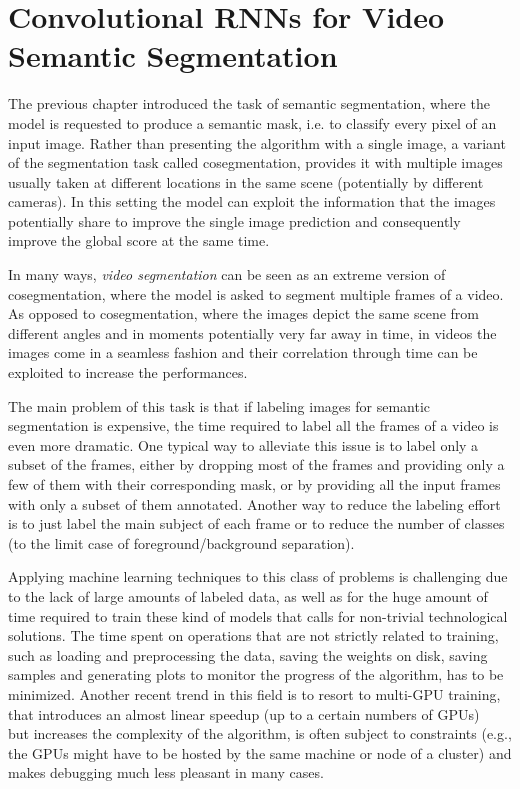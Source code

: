 \chapter{Convolutional RNNs for Video Semantic Segmentation}\label{sec:video_segmentation}

The previous chapter introduced the task of semantic segmentation, where the
model is requested to produce a semantic mask, i.e. to classify every pixel of
an input image. Rather than presenting the algorithm with a single image, a
variant of the segmentation task called cosegmentation, provides it with
multiple images usually taken at different locations in the same scene
(potentially by different cameras). In this setting the model can exploit the
information that the images potentially share to improve the single image
prediction and consequently improve the global score at the same time.

In many ways, \emph{video segmentation} can be seen as an extreme version of
cosegmentation, where the model is asked to segment multiple frames of a video.
As opposed to cosegmentation, where the images depict the same scene from
different angles and in moments potentially very far away in time, in videos the
images come in a seamless fashion and their correlation through time can be
exploited to increase the performances.

The main problem of this task is that if labeling images for semantic
segmentation is expensive, the time required to label all the frames of a
video is even more dramatic. One typical way to alleviate this issue is to
label only a subset of the frames, either by dropping most of the frames and
providing only a few of them with their corresponding mask, or by providing all
the input frames with only a subset of them annotated. Another way to reduce
the labeling effort is to just label the main subject of each frame or to
reduce the number of classes (to the limit case of foreground/background
separation).

Applying machine learning techniques to this class of problems is challenging
due to the lack of large amounts of labeled data, as well as for the huge
amount of time required to train these kind of models that calls for
non-trivial technological solutions. The time spent on operations that are not
strictly related to training, such as loading and preprocessing the data,
saving the weights on disk, saving samples and generating plots to monitor the
progress of the algorithm, has to be minimized. Another recent trend in this
field is to resort to multi-GPU training, that introduces an almost linear
speedup (up to a certain numbers of GPUs)~\cite{theano2016short,ma2016theano}
but increases the complexity of the algorithm, is often subject to constraints
(e.g., the GPUs might have to be hosted by the same machine or node of a
cluster) and makes debugging much less pleasant in many cases.

